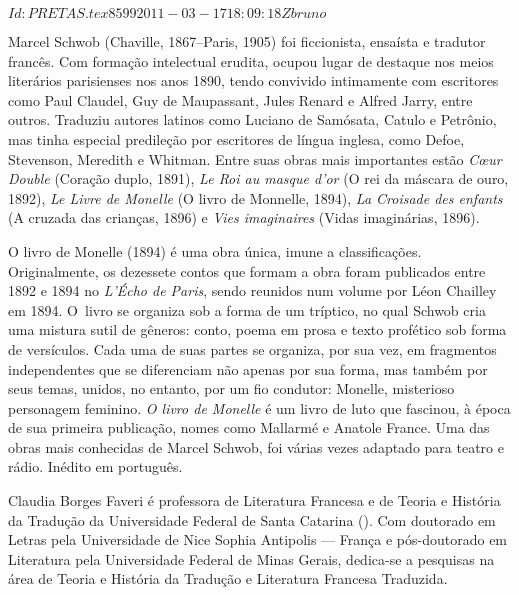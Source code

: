 \SVN $Id: PRETAS.tex 8599 2011-03-17 18:09:18Z bruno $
\begin{resumopage}

\item[Marcel Schwob] (Chaville, 1867--Paris, 1905) foi ficcionista, ensaísta e tradutor francês. 
Com formação intelectual erudita, ocupou lugar de destaque nos meios literários parisienses
nos anos 1890, tendo convivido intimamente com escritores como Paul Claudel,
Guy de Maupassant, Jules Renard e Alfred Jarry, entre outros. Traduziu autores
latinos como Luciano de Samósata, Catulo e Petrônio, mas tinha especial
predileção por escritores de língua inglesa, como Defoe, Stevenson, Meredith e
Whitman. Entre suas obras mais importantes estão \textit{Cœur Double}
(Coração duplo, 1891), \textit{Le Roi au masque d’or} (O rei
da máscara de ouro, 1892), \textit{Le Livre de Monelle} (O livro de
Monnelle, 1894), \textit{La Croisade des enfants} (A cruzada das
crianças, 1896) e \textit{Vies imaginaires} (Vidas imaginárias, 1896).

\item[O livro de Monelle] (1894) é uma obra única, imune a classificações. Originalmente, os dezessete 
contos que formam a obra foram publicados entre 1892 e 1894 no \textit{L'Écho de Paris}, sendo reunidos num volume 
por Léon Chailley em 1894. \mbox{O livro} se organiza sob a forma de um tríptico, no qual Schwob cria uma mistura sutil de
gêneros: conto, poema em prosa e texto profético sob forma de versículos. Cada
uma de suas partes se organiza, por sua vez, em fragmentos independentes que se
diferenciam não apenas por sua forma, mas também por seus temas, unidos, no
entanto, por um fio condutor: Monelle, misterioso personagem feminino. \textit{O livro
de Monelle} é um livro de luto que fascinou, à época de sua
primeira publicação, nomes como Mallarmé e Anatole France. Uma das obras mais
conhecidas de Marcel Schwob, foi várias vezes adaptado para
teatro e rádio. Inédito em português.
        
\item[Claudia Borges Faveri] é professora de Literatura Francesa e de Teoria e
História da Tradução da Universidade Federal de Santa Catarina (). Com
doutorado em Letras pela Universidade de Nice Sophia Antipolis --- França e
pós-doutorado em Literatura pela Universidade Federal de Minas Gerais,
dedica-se a pesquisas na área de Teoria e História da Tradução e Literatura
Francesa Traduzida.

\end{resumopage}

